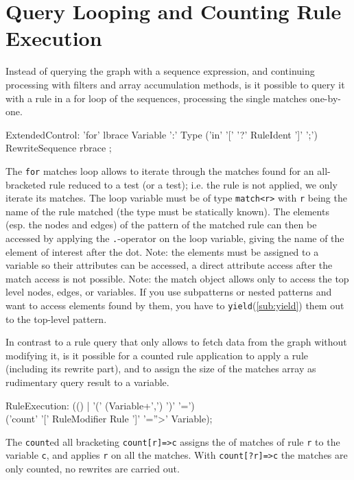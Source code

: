 \section{Query Looping and Counting Rule Execution}

Instead of querying the graph with a sequence expression, and continuing processing with filters and array accumulation methods, is it possible to query it with a rule in a for loop of the sequences, processing the single matches one-by-one.

\begin{rail}
  ExtendedControl:
    'for' lbrace Variable ':' Type
    ('in' '[' '?' RuleIdent ']' ';')\\
    RewriteSequence rbrace
    ;
\end{rail}\label{formatch}

The \texttt{for} matches loop allows to iterate through the matches found for an all-bracketed rule reduced to a test (or a test); i.e. the rule is not applied, we only iterate its matches.
The loop variable must be of type \texttt{match<r>} with \texttt{r} being the name of the rule matched (the type must be statically known).
The elements (esp. the nodes and edges) of the pattern of the matched rule can then be accessed by applying the \texttt{.}-operator on the loop variable, giving the name of the element of interest after the dot.
Note: the elements must be assigned to a variable so their attributes can be accessed, a direct attribute access after the match access is not possible.
Note: the match object allows only to access the top level nodes, edges, or variables.
If you use subpatterns or nested patterns and want to access elements found by them, you have to \texttt{yield}(\ref{sub:yield}) them out to the top-level pattern.

In contrast to a rule query that only allows to fetch data from the graph without modifying it, is it possible for a counted rule application to apply a rule (including its rewrite part), and to assign the size of the matches array as rudimentary query result to a variable.

\begin{rail}
  RuleExecution: (() 
	| '(' (Variable+',') ')' '=') \\ ('count' '[' RuleModifier Rule ']' '=''>' Variable);
\end{rail}

The \texttt{count}ed all bracketing \texttt{count[r]=>c} assigns the  of matches of rule \texttt{r} to the variable \texttt{c}, and applies \texttt{r} on all the matches.
With \texttt{count[?r]=>c} the matches are only counted, no rewrites are carried out.

